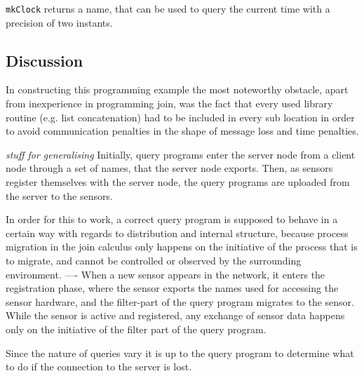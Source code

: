 \texttt{mkClock} returns a name, that can be used to query the current time
with a precision of two instants.


\subsection*{Discussion}

In constructing this programming example the most noteworthy obstacle, apart
from inexperience in programming join, was the fact that every used library
routine (e.g. list concatenation) had to be included in every sub location in
order to avoid communication penalties in the shape of message loss and time
penalties.


\emph{stuff for generalising} Initially, query programs enter the server node
from a client node through a set of names, that the server node exports.  Then,
as sensors register themselves with the server node, the query programs are
uploaded from the server to the sensors.

In order for this to work, a correct query program is supposed to behave in a
certain way with regards to distribution and internal structure, because
process migration in the join calculus only happens on the initiative of the
process that is to migrate, and cannot be controlled or observed by the
surrounding environment.
----
When a new sensor appears in the network, it enters the registration phase,
where the sensor exports the names used for accessing the sensor hardware, and
the filter-part of the query program migrates to the sensor.  While the sensor
is active and registered, any exchange of sensor data happens only on the
initiative of the filter part of the query program.

Since the nature of queries vary it is up to the query program to determine what
to do if the connection to the server is lost.


